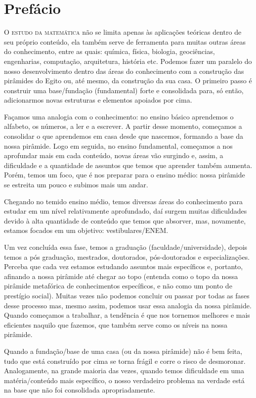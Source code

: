 \chapter{Prefácio}

\lettrine{O}{ estudo da matemática} não se limita apenas às aplicações teóricas dentro de seu próprio conteúdo, ela também serve de ferramenta para muitas outras áreas do conhecimento, entre as quais: química, física, biologia, geociências, engenharias, computação, arquitetura, história etc. Podemos fazer um paralelo do nosso desenvolvimento dentro das áreas do conhecimento com a construção das pirâmides do Egito ou, até mesmo, da construção da sua casa. O primeiro passo é construir uma base/fundação (fundamental) forte e consolidada para, só então, adicionarmos novas estruturas e elementos apoiados por cima.  

Façamos uma analogia com o conhecimento: no ensino básico aprendemos o alfabeto, os números, a ler e a escrever. A partir desse momento, começamos a consolidar o que aprendemos em casa desde que nascemos, formando a base da nossa pirâmide. Logo em seguida, no ensino fundamental, começamos a nos aprofundar mais em cada conteúdo, novas áreas vão surgindo e, assim, a dificuldade e a quantidade de assuntos que temos que aprender também aumenta. Porém, temos um foco, que é nos preparar para o ensino médio: nossa pirâmide se estreita um pouco e subimos mais um andar. 

Chegando no temido ensino médio, temos diversas áreas do conhecimento para estudar em um nível relativamente aprofundado, daí surgem muitas dificuldades devido à alta quantidade de conteúdo que temos que absorver, mas, novamente, estamos focados em um objetivo: vestibulares/ENEM.

Um vez concluída essa fase, temos a graduação (faculdade/universidade), depois temos a pós graduação, mestrados, doutorados, pós-doutorados e especializações. Perceba que cada vez estamos estudando assuntos mais específicos e, portanto, afinando a nossa pirâmide até chegar ao topo (entenda como o topo da nossa pirâmide metafórica de conhecimentos específicos, e não como um ponto de prestígio social). Muitas vezes não podemos concluir ou passar por todas as fases desse processo mas, mesmo assim, podemos usar essa analogia da nossa pirâmide. Quando começamos a trabalhar, a tendência é que nos tornemos melhores e mais eficientes naquilo que fazemos, que também serve como os níveis na nossa pirâmide.

Quando a fundação/base de uma casa (ou da nossa pirâmide) não é bem feita, tudo que está construído por cima se torna frágil e corre o risco de desmoronar. Analogamente, na grande maioria das vezes, quando temos dificuldade em uma matéria/conteúdo mais específico, o nosso verdadeiro problema na verdade está na base que não foi consolidada apropriadamente. 

